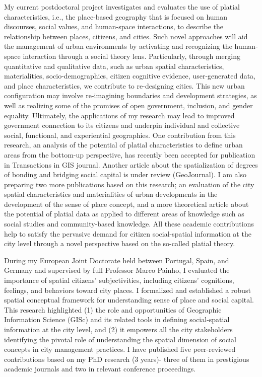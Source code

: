 \documentclass[11pt, a4paper]{awesome-cv}
\begin{document}
\begin{cvletter}
My current postdoctoral project investigates and evaluates the use of platial characteristics, i.e., the place-based geography that is focused on human discourses, social values, and human-space interactions, to describe the relationship between places, citizens, and cities. Such novel approaches will aid the management of urban environments by activating and recognizing the human-space interaction through a social theory lens. Particularly, through merging quantitative and qualitative data, such as urban spatial characteristics, materialities, socio-demographics, citizen cognitive evidence, user-generated data, and place characteristics, we contribute to re-designing cities. This new urban configuration may involve re-imagining boundaries and development strategies, as well as realizing some of the promises of open government, inclusion, and gender equality. Ultimately, the applications of my research may lead to improved government connection to its citizens and underpin individual and collective social, functional, and experiential geographies. One contribution from this research, an analysis of the potential of platial characteristics to define urban areas from the bottom-up perspective, has recently been accepted for publication in Transactions in GIS journal. Another article about the spatialization of degrees of bonding and bridging social capital is under review (GeoJournal). I am also preparing two more publications based on this research; an evaluation of the city spatial characteristics and materialities of urban developments in the development of the sense of place concept, and a more theoretical article about the potential of platial data as applied to different areas of knowledge such as social studies and community-based knowledge. All these academic contributions help to satisfy the pervasive demand for citizen social-spatial information at the city level through a novel perspective based on the so-called platial theory.\par


During my European Joint Doctorate held between Portugal, Spain, and Germany and supervised by full Professor Marco Painho, I evaluated the importance of spatial citizens’ subjectivities, including citizens’ cognitions, feelings, and behaviors toward city places. I formalized and established a robust spatial conceptual framework for understanding sense of place and social capital. This research highlighted (1) the role and opportunities of Geographic Information Science (GISc) and its related tools in defining social-spatial information at the city level, and (2) it empowers all the city stakeholders identifying the pivotal role of understanding the spatial dimension of social concepts in city management practices. I have published five peer-reviewed contributions based on my PhD research (3 years)- three of them in prestigious academic journals and two in relevant conference proceedings.\par


\end{cvletter}
\end{document}
